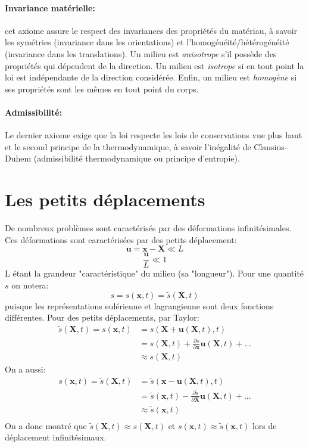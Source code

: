 \paragraph{Invariance matérielle: } cet axiome assure le respect des invariances des propriétés du matériau, à savoir les symétries (invariance dans les orientations) et  l'homogénéité/hétérogénéité (invariance dans les translations). Un milieu est \emph{anisotrope} s'il possède des propriétés qui dépendent de la direction. Un milieu est \emph{isotrope} si en tout point la loi est indépendante de la direction considérée. Enfin, un milieu est \emph{homogène} si ses propriétés sont les mêmes en tout point du corps.
\paragraph{Admissibilité: } Le dernier axiome exige que la loi respecte les lois de conservations vue plus haut et le second principe de la thermodynamique, à savoir l'inégalité de Clausius-Duhem (admissibilité thermodynamique ou principe d'entropie). 

\section{Les petits déplacements}
De nombreux problèmes sont caractérisés par des déformations infinitésimales. Ces déformations sont caractérisées par des petits déplacement:
$$\textbf{u}=\textbf{x}-\textbf{X} \ll L$$ $$\frac{\textbf{u}}{L}\ll 1$$ L étant la grandeur "caractéristique" 
du milieu (sa "longueur"). Pour une quantité $s$ on notera: $$s=s(\textbf{x},t)=\tilde{s}(\textbf{X},t)$$ puisque les représentations eulérienne et lagrangienne sont deux fonctions différentes. Pour des petits déplacements, par Taylor:
\begin{align*}
\tilde{s}(\textbf{X},t)=s(\textbf{x},t)&=s(\textbf{X}+\textbf{u}(\textbf{X},t),t)\\
 & =s(\textbf{X},t)+\frac{\partial s}{\partial \textbf{x}}\textbf{u}(\textbf{X},t)+...\\
 &\approx s(\textbf{X},t)
\end{align*}
On a aussi:
\begin{align*}
s(\textbf{x},t)=\tilde{s}(\textbf{X},t)&=\tilde{s}(\textbf{x}-\textbf{u}(\textbf{X},t),t)\\
 & =\tilde{s}(\textbf{x},t)-\frac{\partial\tilde{s}}{\partial\textbf{X}}\textbf{u}(\textbf{X},t)+...\\
 &\approx \tilde{s}(\textbf{x},t)\\
\end{align*}
On a donc montré que $\tilde{s}(\textbf{X},t)\approx s(\textbf{X},t)$ et $s(\textbf{x},t)\approx\tilde{s}(\textbf{x},t)$ lors de déplacement infinitésimaux. 
